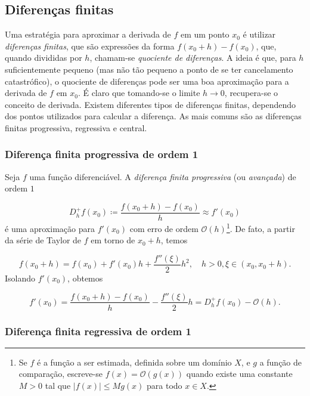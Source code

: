 \documentclass{article}
\begin{document}
\subsection{Diferenças finitas}

Uma estratégia para aproximar a derivada de \(f\) em um ponto \(x_0\) é utilizar \emph{diferenças finitas}, que são expressões da forma \(f(x_0+h)-f(x_0)\), que, quando divididas por \(h\), chamam-se \emph{quociente de diferenças}. A ideia é que, para \(h\) suficientemente pequeno (mas não tão pequeno a ponto de se ter cancelamento catastrófico), o quociente de diferenças pode ser uma boa aproximação para a derivada de \(f\) em \(x_0\). É claro que tomando-se o limite \(h \to 0\), recupera-se o conceito de derivada. Existem diferentes tipos de diferenças finitas, dependendo dos pontos utilizados para calcular a diferença. As mais comuns são as diferenças finitas progressiva, regressiva e central.

\subsubsection{Diferença finita progressiva de ordem 1}

Seja \(f\) uma função diferenciável. A \emph{diferença finita progressiva} (ou \emph{avançada}) de ordem \(1\)

\begin{equation}
    D^+_h f(x_0) \coloneq \frac{f(x_0+h) - f(x_0)}{h} \approx f'(x_0)
\end{equation}
é uma aproximação para \(f'(x_0)\) com erro de ordem \(\mathcal{O}(h)\)\footnote{Se \(f\) é a função a ser estimada, definida sobre um domínio \(X\), e \(g\) a função de comparação, escreve-se \(f(x) = \mathcal{O}(g(x))\) quando existe uma constante \(M>0\) tal que \(\vert f(x) \vert \leq M g(x)\) para todo \(x \in X\).}. De fato, a partir da série de Taylor de \(f\) em torno de \(x_0+h\), temos

\begin{equation}
    f(x_0+h) = f(x_0) + f'(x_0)h + \frac{f''(\xi)}{2}h^2, \quad h>0, \xi \in (x_0, x_0+h).
\end{equation}
Isolando \(f'(x_0)\), obtemos

\begin{equation}
    f'(x_0) = \frac{f(x_0+h) - f(x_0)}{h} - \frac{f''(\xi)}{2}h = D^+_h f(x_0) - \mathcal{O}(h).
\end{equation}

\subsubsection{Diferença finita regressiva de ordem 1}
\end{document}

